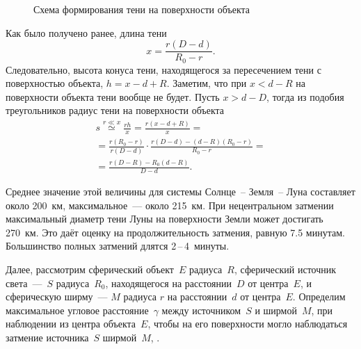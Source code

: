 \begin{figure}[h!]
    \caption{Схема формирования тени на поверхности объекта}
    \label{pic:shadow-size-on-surface}    
\end{figure}

Как было получено ранее, длина тени
\begin{equation*}
    x = \frac{r (D - d)}{R_0 - r}.
\end{equation*}
Следовательно, высота конуса тени, находящегося за пересечением тени с поверхностью объекта, $h = x - d + R$. Заметим, что при $x < d - R$ на поверхности объекта тени вообще не будет. Пусть $x > d - D$, тогда из подобия треугольников радиус тени на поверхности объекта
\begin{multline}
    s 
        \overset{r \ll x}{\simeq} \frac{r h}{x} 
        = \frac{r(x - d + R)}{x} = \\
        = \frac{r (R_0 - r)}{r (D - d)} \cdot \frac{r(D - d) - (d - R)(R_0 - r)}{R_0 - r} = \\
        = \frac{r (D - R) - R_0 (d - R)}{D - d}.
\end{multline}

Среднее значение этой величины для системы Солнце~-- Земля~-- Луна составляет около 200~км, максимальное~--- около 215~км. При нецентральном затмении максимальный диаметр тени Луны на поверхности Земли может достигать 270~км. Это даёт оценку на продолжительность затмения, равную 7.5 минутам. Большинство полных затмений длятся 2\,--\,4~минуты.

Далее, рассмотрим сферический объект~$E$ радиуса~$R$, сферический источник света~---~$S$ радиуса~$R_0$, находящегося на расстоянии~$D$ от центра~$E$, и сферическую ширму~--- $M$ радиуса $r$ на расстоянии~$d$ от центра~$E$. Определим максимальное угловое расстояние~$\gamma$ между источником~$S$ и ширмой~$M$, при наблюдении из центра объекта~$E$, чтобы на его поверхности могло наблюдаться  затмение источника~$S$ ширмой~$M$, .


